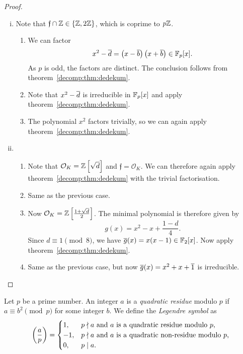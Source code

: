 \begin{proof}
\phantom{i}
\begin{enumerate}[i)]
\item Note that $\mathfrak{f} \cap \mathbb{Z} \in \left\{\mathbb{Z}, 2\mathbb{Z}\right\}$, which is
coprime to $p\mathbb{Z}$.

\begin{enumerate}
\item We can factor
\[
x^2 - \overline{d} = \left(x - \overline{b}\right) \left(x + \overline{b}\right) \in
\mathbb{F}_p[x].
\]
As $p$ is odd, the factors are distinct. The conclusion follows
from theorem~\ref{decomp:thm:dedekum}.
\item Note that $x^2 - \overline{d}$ is irreducible in $\mathbb{F}_p[x]$ and
apply theorem~\ref{decomp:thm:dedekum}.
\item The polynomial $x^2$ factors trivially, so we can again apply
theorem~\ref{decomp:thm:dedekum}.
\end{enumerate}

\item \phantom{i}
\begin{enumerate}
\item Note that $\mathcal{O}_K = \mathbb{Z} \left[\sqrt{d}\right]$ and
$\mathfrak{f} = \mathcal{O}_K$. We can therefore again apply
theorem~\ref{decomp:thm:dedekum} with the trivial factorisation.
\item Same as the previous case.
\item Now $\mathcal{O}_K = \mathbb{Z} \left[\frac{1+\sqrt{d}}{2}\right]$.
The minimal polynomial is therefore given by
\[
g(x) = x^2 - x + \frac{1-d}{4}.
\]
Since $d \equiv 1 \pmod{8}$, we have
$\overline{g}(x) = x(x-1) \in \mathbb{F}_2[x]$. Now apply
theorem~\ref{decomp:thm:dedekum}.
\item Same as the previous case, but now
$\overline{g}(x) = x^2 + x + \overline{1}$ is irreducible. \qedhere
\end{enumerate}
\end{enumerate}
\end{proof}

\begin{definicija}
Let $p$ be a prime number. An integer $a$ is a
\emph{quadratic residue} modulo $p$ if
$a \equiv b^2 \pmod{p}$ for some integer $b$. We define the
\emph{Legendre symbol} as
\[
\left(\frac{a}{p}\right) =
\begin{cases}
1, & \text{$p \nmid a$ and $a$ is a quadratic residue modulo $p$,}
\\
-1, & \text{$p \nmid a$ and $a$ is a quadratic non-residue modulo
$p$,}
\\
0, & p \mid a.
\end{cases}
\]
\end{definicija}

